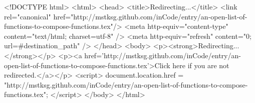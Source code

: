<!DOCTYPE html>
<html>
<head>
<title>Redirecting...</title>
<link rel="canonical" href="http://mstksg.github.com/inCode/entry/an-open-list-of-functions-to-compose-functions.tex"/>
<meta http-equiv="content-type" content="text/html; charset=utf-8" />
<meta http-equiv="refresh" content="0; url=#{destination_path}" />
</head>
<body>
  <p><strong>Redirecting...</strong></p>
  <p><a href='http://mstksg.github.com/inCode/entry/an-open-list-of-functions-to-compose-functions.tex'>Click here if you are not redirected.</a></p>
  <script>
    document.location.href = "http://mstksg.github.com/inCode/entry/an-open-list-of-functions-to-compose-functions.tex";
  </script>
</body>
</html>
